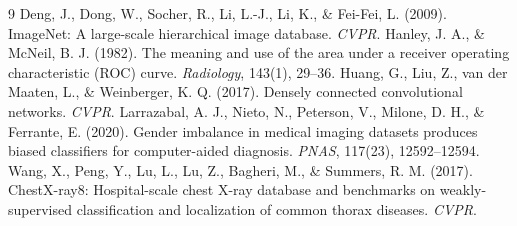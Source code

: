 \documentclass[11pt]{article}
\begin{document}
\begin{thebibliography}{9}
 Deng, J., Dong, W., Socher, R., Li, L.-J., Li, K., \& Fei-Fei, L. (2009). ImageNet: A large-scale hierarchical image database. \emph{CVPR}.
 Hanley, J. A., \& McNeil, B. J. (1982). The meaning and use of the area under a receiver operating characteristic (ROC) curve. \emph{Radiology}, 143(1), 29--36.
 Huang, G., Liu, Z., van der Maaten, L., \& Weinberger, K. Q. (2017). Densely connected convolutional networks. \emph{CVPR}.
 Larrazabal, A. J., Nieto, N., Peterson, V., Milone, D. H., \& Ferrante, E. (2020). Gender imbalance in medical imaging datasets produces biased classifiers for computer-aided diagnosis. \emph{PNAS}, 117(23), 12592--12594.
 Wang, X., Peng, Y., Lu, L., Lu, Z., Bagheri, M., \& Summers, R. M. (2017). ChestX-ray8: Hospital-scale chest X-ray database and benchmarks on weakly-supervised classification and localization of common thorax diseases. \emph{CVPR}.
\end{thebibliography}
\end{document}
